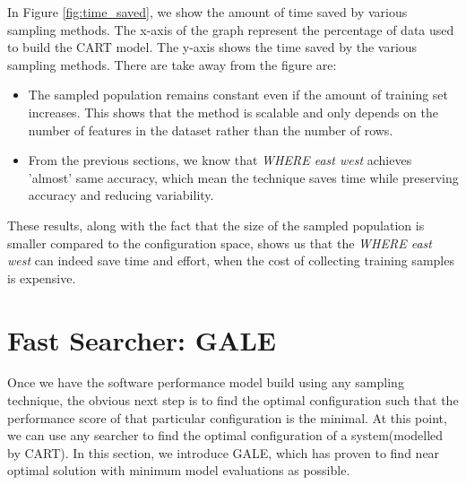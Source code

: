 \documentclass{sig-alternative}
\newcommand{\bi}{\begin{itemize}}%
\newcommand{\ei}{\end{itemize}}
\begin{document}
In Figure \ref{fig:time_saved}, we show the amount of time saved by various sampling methods. The x-axis of the graph represent the percentage of data used to build the CART model. The y-axis shows the time saved by the various sampling methods. There are take away from the figure are:
\bi
    \item{The sampled population remains constant even if the amount of training set increases. This shows that the method is scalable and only depends on the number of features in the dataset rather than the number of rows.}
    \item{From the previous sections, we know that \textit{WHERE east west} achieves 'almost' same accuracy,
    which mean the technique saves time while preserving accuracy and reducing variability.}
\ei


These results, along with the fact that the size of the sampled population is smaller compared to the configuration space, shows us that the \textit{WHERE east west} can indeed save time and effort, when the cost of collecting training samples is expensive.

\section{Fast Searcher: GALE}
Once we have the software performance model build using any sampling technique, the obvious next step is to find the optimal configuration such that the performance score of that particular configuration is the minimal. At this point, we can use any searcher to find the optimal configuration of a system(modelled by CART). In this section, we introduce GALE, which has proven to find near optimal solution with minimum model evaluations as possible. 
\end{document}
